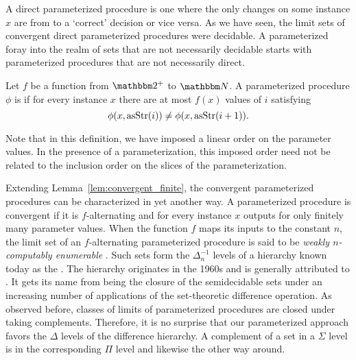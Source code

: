 A direct parameterized procedure is one where the only changes on some instance $x$ are from  to a `correct' decision or vice versa.
As we have seen, the limit sets of convergent direct parameterized procedures were decidable.
A parameterized foray into the realm of sets that are not necessarily decidable starts with parameterized procedures that are not necessarily direct.
\begin{definition}
  Let $f$ be a function from $\binary^+$ to $\bbN$.
  A parameterized procedure $\phi$ is  if for every instance $x$ there are at most $f(x)$ values of $i$ satisfying
  \begin{equation*}
    \phi(x, \operatorname{asStr}(i)) \neq \phi(x, \operatorname{asStr}(i + 1)).
  \end{equation*}
\end{definition}

Note that in this definition, we have imposed a linear order on the parameter values.
In the presence of a parameterization, this imposed order need not be related to the inclusion order on the slices of the parameterization.

Extending Lemma~\ref{lem:convergent_finite}, the convergent parameterized procedures can be characterized in yet another way.
A parameterized procedure is convergent if it is $f$-alternating and for every instance $x$ outputs  for only finitely many parameter values.
When the function $f$ maps its inputs to the constant $n$, the limit set of an $f$-alternating parameterized procedure is said to be \emph{weakly $n$-computably enumerable} \parencite{odifreddi1992classical,epstein1981hierarchies}.
Such sets form the $\Delta^{-1}_n$ levels of a hierarchy known today as the  \parencite{downey2010algorithmic}.
The hierarchy originates in the 1960s \parencite{putnam1965trial,gold1965limiting,ershov1968hierarchyi} and is generally attributed to \citeauthor{ershov1968hierarchyi}.
It gets its name from being the closure of the semidecidable sets under an increasing number of applications of the set-theoretic difference operation.
As observed before, classes of limits of parameterized procedures are closed under taking complements.
Therefore, it is no surprise that our parameterized approach favors the $\Delta$ levels of the difference hierarchy.
A complement of a set in a $\Sigma$ level is in the corresponding $\Pi$ level and likewise the other way around.

